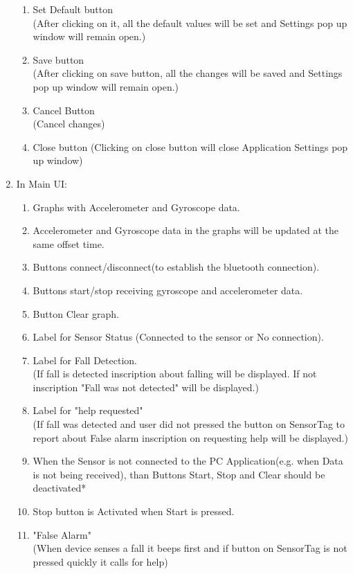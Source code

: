\documentclass[conference,12pt]{IEEETran}
\begin{document}
\begin{enumerate}
\begin{enumerate}
		\item Set Default button\\
		(After clicking on it, all the default values will be set and Settings pop up window will remain open.)
		\item Save button\\
		(After clicking on save button, all the changes will be saved and Settings pop up window will remain open.)
		\item Cancel Button\\
		(Cancel changes)
		\item Close button
		(Clicking on close button will close Application Settings pop up window) 
	\end{enumerate}
	\item In Main UI:
	\begin{enumerate}
		\item Graphs with Accelerometer and Gyroscope data.
		\item Accelerometer and Gyroscope data in the graphs will be updated at the same offset time.
		\item Buttons connect/disconnect(to establish the bluetooth connection).
		\item Buttons start/stop receiving gyroscope and accelerometer data.
		\item Button Clear graph.
		\item Label for Sensor Status (Connected to the sensor or No connection).
		\item Label for Fall Detection.\\
		(If fall is detected inscription about falling will be displayed.
		If not  inscription "Fall was not detected" will be displayed.)
		\item Label for "help requested"\\
		(If fall was detected and user did not pressed the button on SensorTag to report about False alarm inscription on requesting help will be displayed.)
		\item When the Sensor is not connected to the PC Application(e.g. when Data is not being received), than Buttons Start, Stop and Clear should be deactivated*
		\item Stop button is Activated when Start is pressed.
		\item "False Alarm" \\
		(When device senses a fall it beeps first and if button on 	SensorTag is not pressed quickly it calls for help)
	\end{enumerate}
\end{enumerate}
\end{document}

